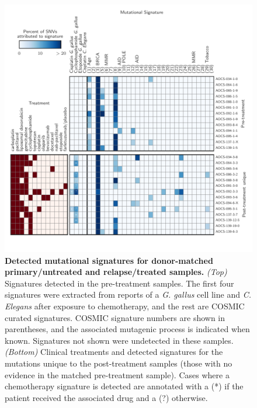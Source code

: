 \FloatBarrier

\begin{figure}[htbp]
\centering
\includegraphics[scale=1.0]{figures/signatures.pdf}
\caption{\textbf{Detected mutational signatures for donor-matched primary/untreated and relapse/treated samples.} \textit{(Top)} Signatures detected in the pre-treatment samples. The first four signatures were extracted from reports of a \textit{G. gallus} cell line and \textit{C. Elegans} after exposure to chemotherapy, and the rest are COSMIC curated signatures. COSMIC signature numbers are shown in parentheses, and the associated mutagenic process is indicated when known. Signatures not shown were undetected in these samples. \textit{(Bottom)} Clinical treatments and detected signatures for the mutations unique to the post-treatment samples (those with no evidence in the matched pre-treatment sample). Cases where a chemotherapy signature is detected are annotated with a (*) if the patient received the associated drug and a (?) otherwise.}
\label{fig:signatures}
\end{figure}

